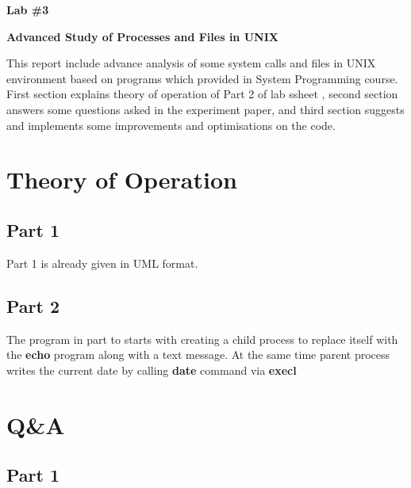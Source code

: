 \documentclass[11pt]{article}
\makeatletter
\renewenvironment{titlepage}
    {%
      \cleardoublepage
      \if@twocolumn
        \@restonecoltrue\onecolumn
      \else
        \@restonecolfalse\newpage
      \fi
      \thispagestyle{empty}%
    }%
    {\if@restonecol\twocolumn \else \newpage \fi
    }
\renewenvironment{titlepage}
    {%
      \cleardoublepage
      \if@twocolumn
        \@restonecoltrue\onecolumn
      \else
        \@restonecolfalse\newpage
      \fi
      \thispagestyle{empty}%
    }%
    {\if@restonecol\twocolumn \else \newpage \fi
     \if@twoside\else
     \fi
    }
\makeatother
\begin{document}
\begin{titlepage}
   \begin{center}
       \vspace*{5cm}
 
       \textbf{ \LARGE Lab \#3}
       
       \vspace{0.5cm}
 	\textbf{Advanced Study of Processes and Files in UNIX}
 	
       \vspace{0.5cm}
This report include advance analysis of some system calls and files in UNIX environment based on programs which provided in System Programming course. First section explains theory of operation of Part 2 of lab ssheet , second section answers some questions asked in the experiment paper, and third section suggests and implements some improvements and optimisations on the code.
 
   \end{center}
\end{titlepage}



\section*{Theory of Operation}
\subsection*{Part 1}

Part 1 is already given in UML format.
\subsection*{Part 2}

The program in part to starts with creating a child process to replace itself with the \textbf{echo} program along with a text message. At the same time parent process writes the current date by calling \textbf{date} command via \textbf{execl}
\section*{Q\&A}



\subsection*{Part 1}
\end{document}
